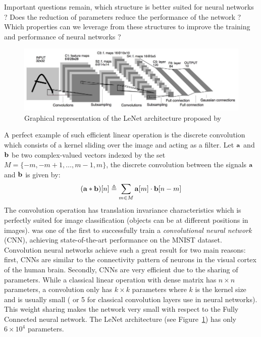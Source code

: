Important questions remain, which structure is better suited for neural networks ? Does the reduction of parameters reduce the performance of the network ? Which properties can we leverage from these structures to improve the training and performance of neural networks ? 




\begin{figure}[ht]
  \centering
  \includegraphics[scale=0.4]{figures/chapter1/lenet.jpg}
  \caption{Graphical representation of the LeNet architecture proposed by \citet{lecun1998gradient}}
  \label{figure:lenet_network}
\end{figure}

A perfect example of such efficient linear operation is the discrete convolution which consists of a kernel sliding over the image and acting as a filter.
Let $\mathbf{a}$ and $\mathbf{b}$ be two complex-valued vectors indexed by the set $M = \{-m, -m+1, \dots, m-1, m\}$, the discrete convolution between the signals $\mathbf{a}$ and $\mathbf{b}$ is given by: 
\begin{equation}
  (\avec \ast \bvec) \left[ n \right] \triangleq \sum_{m \in M} \avec\left[m\right] \cdot \bvec\left[n - m\right]
\end{equation}
The convolution operation has translation invariance characteristics \cite{zhang1990parallel} which is perfectly suited for image classification (objects can be at different positions in images).  
\citet{lecun1998gradient} was one of the first to successfully train a \emph{convolutional neural network} (CNN), achieving state-of-the-art performance on the MNIST dataset.
Convolution neural networks achieve such a great result for two main reasons:
first, CNNs are similar to the connectivity pattern of neurons in the visual cortex of the human brain. 
Secondly, CNNs are very efficient due to the sharing of parameters. 
While a classical linear operation with dense matrix has $n \times n$ parameters, a convolution only has $k \times k$ parameters where $k$ is the kernel size and is usually small ( or 5 for classical convolution layers use in neural networks).
This weight sharing makes the network very small with respect to the Fully Connected neural network. The LeNet architecture (see Figure~\ref{figure:lenet_network}) has only $6 \times 10^4$ parameters.  

